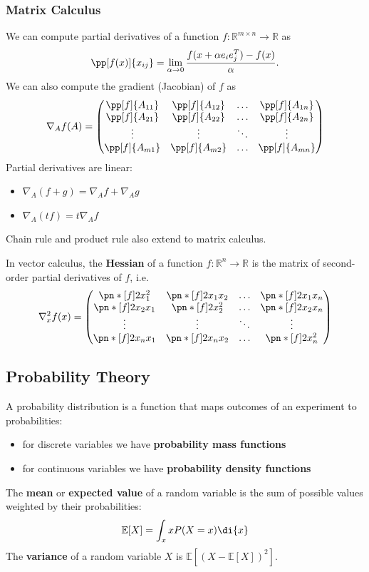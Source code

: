 \documentclass[11pt]{article}
\begin{document}
\subsubsection*{Matrix Calculus}
We can compute partial derivatives of a function $f: \mathbb{R}^{m\times n} \rightarrow \mathbb{R}$ as 
\[ \pp[f(x)]{x_{ij}} = \lim_{\alpha \rightarrow 0} \frac{f(x + \alpha e_ie_j^T) - f(x)}{\alpha}. \] 
We can also compute the gradient (Jacobian) of $f$ as 
\[ \nabla_Af(A) = \begin{pmatrix}
    \pp[f]{A_{11}} & \pp[f]{A_{12}} & \ldots & \pp[f]{A_{1n}} \\
    \pp[f]{A_{21}} & \pp[f]{A_{22}} & \ldots & \pp[f]{A_{2n}} \\
    \vdots & \vdots & \ddots & \vdots \\
    \pp[f]{A_{m1}} & \pp[f]{A_{m2}} & \ldots & \pp[f]{A_{mn}} 
\end{pmatrix} \] 
Partial derivatives are linear: 
\begin{itemize}
    \item $\nabla_A(f + g) = \nabla_Af + \nabla_Ag$
    \item $\nabla_A(tf) = t\nabla_Af$
\end{itemize}
Chain rule and product rule also extend to matrix calculus. \par 
In vector calculus, the \textbf{Hessian} of a function $f: \mathbb{R}^n \rightarrow \mathbb{R}$ is the matrix of second-order partial derivatives of $f$, i.e. 
\[ \nabla_x^2 f(x) = \begin{pmatrix} 
    \pn*[f]{2}{x_1^2} & \pn*[f]{2}{x_1x_2} & \ldots & \pn*[f]{2}{x_1x_n} \\
    \pn*[f]{2}{x_2x_1} & \pn*[f]{2}{x_2^2} & \ldots & \pn*[f]{2}{x_2x_n} \\
    \vdots & \vdots & \ddots & \vdots \\
    \pn*[f]{2}{x_nx_1} & \pn*[f]{2}{x_nx_2} & \ldots & \pn*[f]{2}{x_n^2}
\end{pmatrix} \]  

\subsection{Probability Theory} 
A probability distribution is a function that maps outcomes of an experiment to probabilities: 
\begin{itemize}
    \item for discrete variables we have \textbf{probability mass functions} 
    \item for continuous variables we have \textbf{probability density functions} 
\end{itemize}
The \textbf{mean} or \textbf{expected value} of a random variable is the sum of possible values weighted by their probabilities: 
\[ \mathbb{E}[X] = \int_x x P(X = x) \di{x} \] 
The \textbf{variance} of a random variable $X$ is $\mathbb{E}[(X - \mathbb{E}[X])^2]$. \par 
\end{document}
